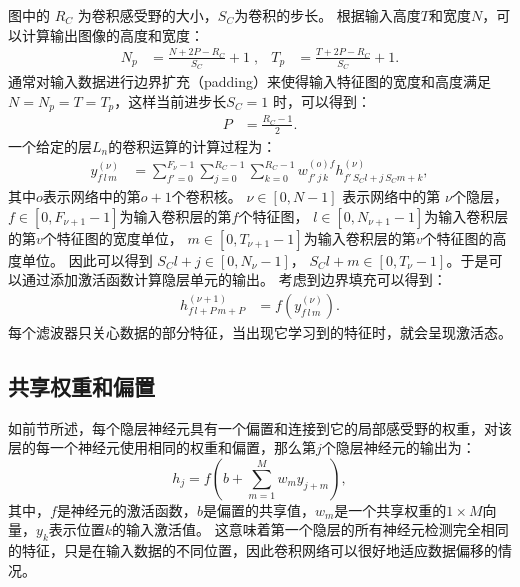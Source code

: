 图中的 $R_C$ 为卷积感受野的大小，$S_C$为卷积的步长。
根据输入高度$ T $和宽度$ N $，可以计算输出图像的高度和宽度：
\begin{align}
  N_p&=\frac{N+2P-R_C}{S_C}+1 \;,&
  T_p&=\frac{T+2P-R_C}{S_C}+1.
\end{align}
通常对输入数据进行边界扩充（padding）来使得输入特征图的宽度和高度满足$ N = N_p = T = T_p $，这样当前进步长$ S_C = 1 $ 时，可以得到：
\begin{align}
P&=\frac{R_C-1}{2}.
\end{align}
一个给定的层$ L_n $的卷积运算的计算过程为：
\begin{align}
y_{f\,l\,m}^{(\nu)}&=\sum^{F_\nu-1}_{f'=0}\sum^{R_C-1}_{j=0}\sum^{R_C-1}_{k=0}
w^{(o)f}_{f'\,j\,k}h^{(\nu)}_{f'\,S_Cl+j\,S_Cm+k},
\end{align}
其中$ o $表示网络中的第$ o + 1 $个卷积核。
$\nu \in [0,N-1 ]$ 表示网络中的第 $\nu$个隐层，$f\in[0,F_{\nu+1}-1]$为输入卷积层的第$f$个特征图， $l\in[0,N_{\nu+1}-1 ]$为输入卷积层的第$v$个特征图的宽度单位， $m\in[0,T_{\nu+1}-1 ]$为输入卷积层的第$v$个特征图的高度单位。 因此可以得到 $S_Cl+j\in[0,N_\nu-1 ]$， $S_Cl+m\in[0,T_\nu-1 ]$。于是可以通过添加激活函数计算隐层单元的输出。
考虑到边界填充可以得到：
\begin{align}
h_{f\,l+P\,m+P}^{(\nu+1)}&=f\left(y_{f\,l\,m}^{(\nu)}\right).
\end{align}
每个滤波器只关心数据的部分特征，当出现它学习到的特征时，就会呈现激活态。

\subsection{共享权重和偏置}
如前节所述，每个隐层神经元具有一个偏置和连接到它的局部感受野的权重，对该层的每一个神经元使用相同的权重和偏置，那么第$j$个隐层神经元的输出为：
\begin{equation}
  h_j = f(b+\sum_{m=1}^M w_m y_{j+m}),
  \label{equ:shared_weight}
\end{equation}
其中，$f$是神经元的激活函数，$b$是偏置的共享值，$w_m$是一个共享权重的$1\times M$向量，$y_k$表示位置$k$的输入激活值。
这意味着第一个隐层的所有神经元检测完全相同的特征，只是在输入数据的不同位置，因此卷积网络可以很好地适应数据偏移的情况。

